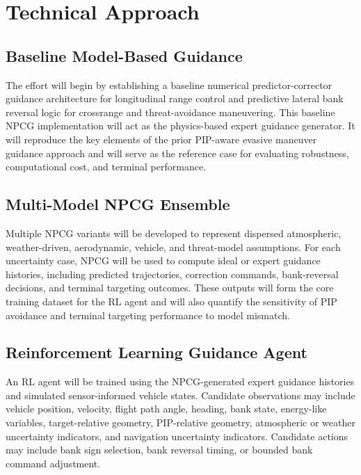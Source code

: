 \section{Technical Approach}

\subsection{Baseline Model-Based Guidance}

The effort will begin by establishing a baseline numerical predictor-corrector guidance architecture for longitudinal range control and predictive lateral bank reversal logic for crossrange and threat-avoidance maneuvering. This baseline NPCG implementation will act as the physics-based expert guidance generator. It will reproduce the key elements of the prior PIP-aware evasive maneuver guidance approach and will serve as the reference case for evaluating robustness, computational cost, and terminal performance.

\subsection{Multi-Model NPCG Ensemble}

Multiple NPCG variants will be developed to represent dispersed atmospheric, weather-driven, aerodynamic, vehicle, and threat-model assumptions. For each uncertainty case, NPCG will be used to compute ideal or expert guidance histories, including predicted trajectories, correction commands, bank-reversal decisions, and terminal targeting outcomes. These outputs will form the core training dataset for the RL agent and will also quantify the sensitivity of PIP avoidance and terminal targeting performance to model mismatch.

\subsection{Reinforcement Learning Guidance Agent}

An RL agent will be trained using the NPCG-generated expert guidance histories and simulated sensor-informed vehicle states. Candidate observations may include vehicle position, velocity, flight path angle, heading, bank state, energy-like variables, target-relative geometry, PIP-relative geometry, atmospheric or weather uncertainty indicators, and navigation uncertainty indicators. Candidate actions may include bank sign selection, bank reversal timing, or bounded bank command adjustment.

